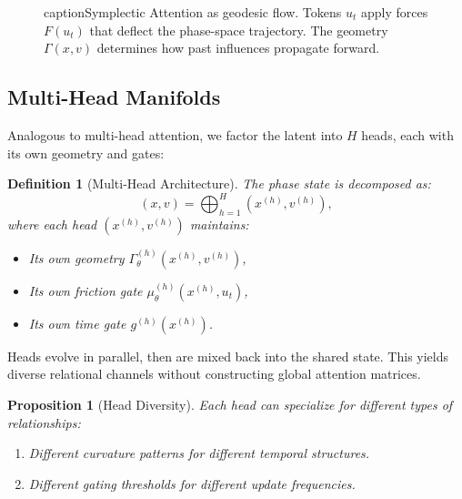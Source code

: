\documentclass[12pt,letterpaper,twoside]{article}
\newtheorem{definition}{Definition}[section]
\newtheorem{prop}{Proposition}[section]
\begin{document}
\begin{figure}[htbp]
caption{Symplectic Attention as geodesic flow. Tokens $u_t$ apply forces $F(u_t)$ that deflect the phase-space trajectory. The geometry $\Gamma(x,v)$ determines how past influences propagate forward.}
\label{fig:geodesic-flow}
\end{figure}

\subsection{Multi-Head Manifolds}

Analogous to multi-head attention, we factor the latent into $H$ heads, each with its own geometry and gates:

\begin{definition}[Multi-Head Architecture]
The phase state is decomposed as:
\[
(x, v) = \bigoplus_{h=1}^{H} (x^{(h)}, v^{(h)}),
\]
where each head $(x^{(h)}, v^{(h)})$ maintains:
\begin{itemize}
\item Its own geometry $\Gamma_\theta^{(h)}(x^{(h)}, v^{(h)})$,
\item Its own friction gate $\mu_\theta^{(h)}(x^{(h)}, u_t)$,
\item Its own time gate $g^{(h)}(x^{(h)})$.
\end{itemize}
\end{definition}

Heads evolve in parallel, then are mixed back into the shared state. This yields diverse relational channels without constructing global attention matrices.

\begin{prop}[Head Diversity]
Each head can specialize for different types of relationships:
\begin{enumerate}
\item Different curvature patterns for different temporal structures.
\item Different gating thresholds for different update frequencies.
\end{enumerate}
\end{prop}
\end{document}
